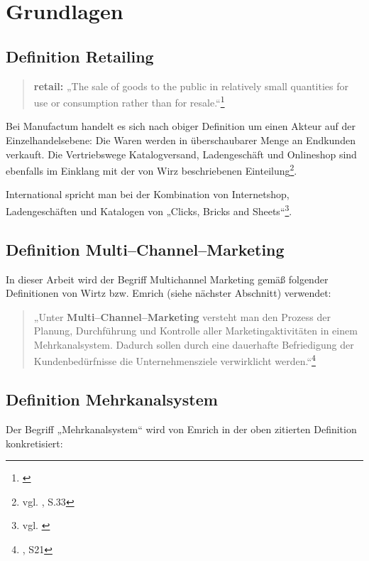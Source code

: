 \section{Grundlagen}
\label{sec:grundlagen}


\subsection{Definition Retailing}

\begin{quote}\textbf{retail:} „The sale of goods to the public in relatively small quantities for use or consumption rather than for resale.“\footnote{\cite{oxford:retail}}\end{quote}

Bei Manufactum handelt es sich nach obiger Definition um einen Akteur auf der Einzelhandelsebene: Die Waren werden in überschaubarer Menge an Endkunden verkauft. Die Vertriebswege Katalogversand, Ladengeschäft und Onlineshop sind ebenfalls im Einklang mit der von Wirz beschriebenen Einteilung\footnote{vgl. \cite{wirtz}, S.33}.

International spricht man bei der Kombination von Internetshop, Ladengeschäften und Katalogen von „Clicks, Bricks and Sheets“\footnote{vgl. \cite{klein}}.

\subsection{Definition Multi--Channel--Marketing}

In dieser Arbeit wird der Begriff Multichannel Marketing gemäß folgender Definitionen von Wirtz bzw. Emrich (siehe nächster Abschnitt) verwendet:

\begin{quote}„Unter \textbf{Multi--Channel--Marketing} versteht man den Prozess der Planung, Durchführung und Kontrolle aller Marketingaktivitäten in einem Mehrkanalsystem. Dadurch sollen durch eine dauerhafte Befriedigung der Kundenbedürfnisse die Unternehmensziele verwirklicht werden.“\footnote{\cite{wirtz}, S21}\end{quote} 

\subsection{Definition Mehrkanalsystem}

Der Begriff „Mehrkanalsystem“ wird von Emrich in der oben zitierten Definition konkretisiert:

